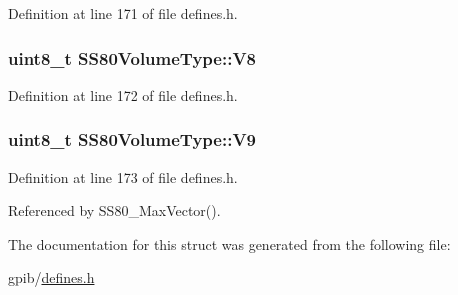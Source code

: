 Definition at line 171 of file defines.\+h.

\subsubsection[{\texorpdfstring{V8}{V8}}]{\setlength{\rightskip}{0pt plus 5cm}uint8\+\_\+t S\+S80\+Volume\+Type\+::\+V8}\hypertarget{structSS80VolumeType_a0859b6387f103bf2c3aee91d8786f4a8}{}\label{structSS80VolumeType_a0859b6387f103bf2c3aee91d8786f4a8}


Definition at line 172 of file defines.\+h.

\subsubsection[{\texorpdfstring{V9}{V9}}]{\setlength{\rightskip}{0pt plus 5cm}uint8\+\_\+t S\+S80\+Volume\+Type\+::\+V9}\hypertarget{structSS80VolumeType_aeea3a5985e301877bb9011e2df62b427}{}\label{structSS80VolumeType_aeea3a5985e301877bb9011e2df62b427}


Definition at line 173 of file defines.\+h.



Referenced by S\+S80\+\_\+\+Max\+Vector().



The documentation for this struct was generated from the following file\+:\begin{DoxyCompactItemize}
\item 
gpib/\hyperlink{defines_8h}{defines.\+h}\end{DoxyCompactItemize}
